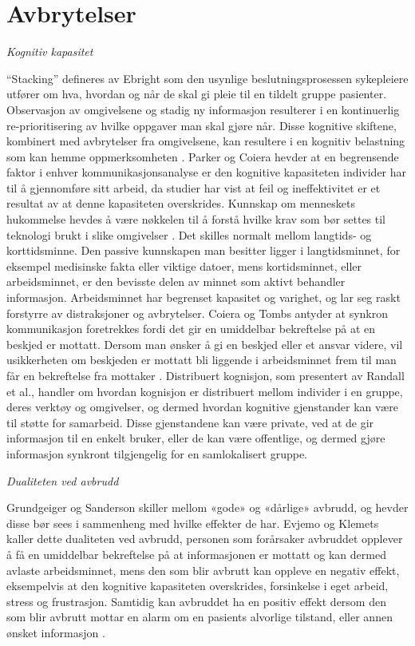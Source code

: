 \section{Avbrytelser}
\label{chp: avbrytelser} 

\emph{Kognitiv kapasitet}

\noindent
“Stacking” defineres av Ebright som den usynlige beslutningsprosessen sykepleiere utfører om hva, hvordan og når de skal gi pleie til en tildelt gruppe pasienter. Observasjon av omgivelsene og stadig ny informasjon resulterer i en kontinuerlig re-prioritisering av hvilke oppgaver man skal gjøre når. Disse kognitive skiftene, kombinert med avbrytelser fra omgivelsene, kan resultere i en kognitiv belastning som kan hemme oppmerksomheten \cite{Ebright10}. Parker og Coiera hevder at en begrensende faktor i enhver kommunikasjonsanalyse er den kognitive kapasiteten individer har til å gjennomføre sitt arbeid, da studier har vist at feil og ineffektivitet er et resultat av at denne kapasiteten overskrides. Kunnskap om menneskets hukommelse hevdes å være nøkkelen til å forstå hvilke krav som bør settes til teknologi brukt i slike omgivelser \cite{Parker00}.
Det skilles normalt mellom langtids- og korttidsminne. Den passive kunnskapen man besitter ligger i langtidsminnet, for eksempel medisinske fakta eller viktige datoer, mens kortidsminnet, eller arbeidsminnet, er den bevisste delen av minnet som aktivt behandler informasjon. Arbeidsminnet har begrenset kapasitet og varighet, og lar seg raskt forstyrre av distraksjoner og avbrytelser. Coiera og Tombs antyder at synkron kommunikasjon foretrekkes fordi det gir en umiddelbar bekreftelse på at en beskjed er mottatt. Dersom man ønsker å gi en beskjed eller et ansvar videre, vil usikkerheten om beskjeden er mottatt bli liggende i arbeidsminnet frem til man får en bekreftelse fra mottaker \cite{Parker00}. 
Distribuert kognisjon, som presentert av Randall et al., handler om hvordan kognisjon er distribuert mellom individer i en gruppe, deres verktøy og omgivelser, og dermed hvordan kognitive gjenstander kan være til støtte for samarbeid. Disse gjenstandene kan være private, ved at de gir informasjon til en enkelt bruker, eller de kan være offentlige, og dermed gjøre informasjon synkront tilgjengelig for en samlokalisert gruppe. 
 
\noindent
\emph{Dualiteten ved avbrudd}

\noindent
Grundgeiger og Sanderson skiller mellom «gode» og «dårlige» avbrudd, og hevder disse bør sees i sammenheng med hvilke effekter de har. Evjemo og Klemets kaller dette dualiteten ved avbrudd, personen som forårsaker avbruddet opplever å få en umiddelbar bekreftelse på at informasjonen er mottatt og kan dermed avlaste arbeidsminnet, mens den som blir avbrutt kan oppleve en negativ effekt, eksempelvis at den kognitive kapasiteten overskrides, forsinkelse i eget arbeid, stress og frustrasjon. Samtidig kan avbruddet ha en positiv effekt dersom den som blir avbrutt mottar en alarm om en pasients alvorlige tilstand, eller annen ønsket informasjon \cite{Evjemo, Grundgeiger09}. 

